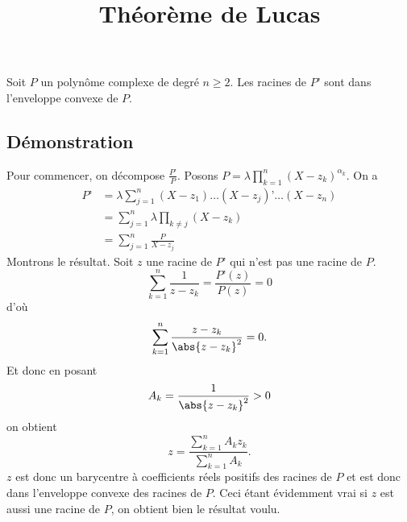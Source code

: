 \documentclass[fontsize=12pt,twoside=false,parskip=half, french]{scrartcl}
\title{Théorème de Lucas}
\date{}
\author{}
\begin{document}
\maketitle
   \begin{Theoreme}
      Soit $P$ un polynôme complexe de degré $n \geq 2$. Les racines de $P’$ sont
      dans l’enveloppe convexe de $P$.
   \end{Theoreme}
   \subsection{Démonstration}
   Pour commencer, on décompose $\frac{P’}{P}$. Posons $P = \lambda \prod_{k = 1}^{n} 
   (X - z_k)^{\alpha_k}$. On a  
   \begin{align*}
      P’ &= \lambda \sum_{j = 1}^n (X - z_1) \ldots (X - z_j)’ \ldots (X - z_n)\\
         &= \sum_{j = 1}^n \lambda \prod_{k \neq j} (X - z_k) \\
         &= \sum_{j = 1}^n \frac{P}{X - z_j}
   \end{align*}
   Montrons le résultat. Soit $z$ une racine de $P’$ qui n’est pas une racine de $P$. 
   \[
      \sum_{k = 1}^n \frac{1}{z - z_k} = \frac{P’(z)}{P(z)} = 0
   \]
   d’où
   \[
   \sum_{k = 1}^n \frac{z - z_k}{\abs{z - z_k}^2} = 0. 
   \]
   Et donc en posant 
   \[
      A_k = \frac{1}{\abs{z - z_k}^2} > 0
   \]
   on obtient
   \[
      z = \frac{\sum_{k = 1}^n A_k z_k}{\sum_{k = 1}^n A_k}.
   \]
  $z$ est donc un barycentre à coefficients réels positifs des racines de 
  $P$ et est donc dans l’enveloppe convexe des racines de $P$. Ceci étant 
  évidemment vrai si $z$ est aussi une racine de $P$, on obtient bien
  le résultat voulu.
\end{document}
